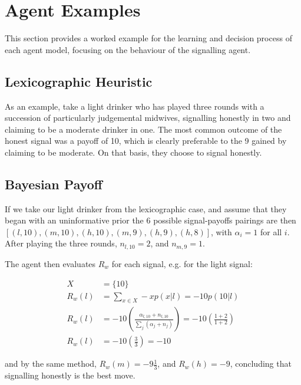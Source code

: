 \chapter{Agent Examples}
\label{sec:agent_eg}

This section provides a worked example for the learning and decision process of each agent model, focusing on the behaviour of the signalling agent.

\section{Lexicographic Heuristic}
\label{sub:lexico_eg}

As an example, take a light drinker who has played three rounds with a succession of particularly judgemental midwives, signalling honestly in two and claiming to be a moderate drinker in one. The most common outcome of the honest signal was a payoff of 10, which is clearly preferable to the 9 gained by claiming to be moderate. On that basis, they choose to signal honestly.

\section{Bayesian Payoff}
\label{sub:payoff_eg}

If we take our light drinker from the lexicographic case, and assume that they began with an uninformative prior the 6 possible signal-payoffs pairings are then \([(l,10),(m,10),(h,10),(m,9),(h,9),(h,8)]\), with \(\alpha_{i}=1\) for all \(i\). After playing the three rounds, \(n_{l,10}=2\), and \(n_{m,9}=1\).

The agent then evaluates \(R_{w}\) for each signal, e.g. for the light signal:

\begin{equation*}
\begin{aligned}
X &= \{10\}\\
R_{w}(l) &= \sum_{x \in X} -xp(x | l) = -10p(10 | l)\\
R_{w}(l) &= -10(\frac{\alpha_{l,10}+n_{l,10}}{\sum_{j}(\alpha_{j}+n_{j})}) = -10(\frac{1+2}{1+2})\\
R_{w}(l) &= -10(\frac{3}{3}) = -10
\end{aligned}
\end{equation*}

and by the same method, \(R_{w}(m)=-9\frac{1}{3}\), and \(R_{w}(h)=-9\), concluding that signalling honestly is the best move.

